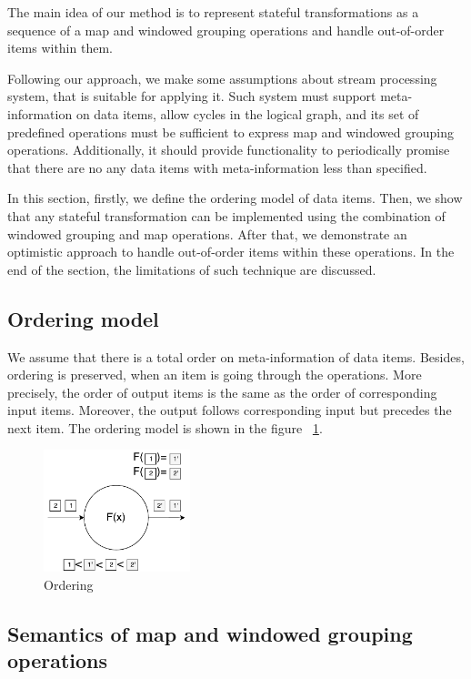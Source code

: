 
\label {fs-optimistic}

The main idea of our method is to represent stateful transformations as a sequence of a map and windowed grouping operations and handle out-of-order items within them. 

Following our approach, we make some assumptions about stream processing system, that is suitable for applying it. Such system must support meta-information on data items, allow cycles in the logical graph, and its set of predefined operations must be sufficient to express map and windowed grouping operations. Additionally, it should provide functionality to periodically promise that there are no any data items with meta-information less than specified.

In this section, firstly, we define the ordering model of data items. Then, we show that any stateful transformation can be implemented using the combination of windowed grouping and map operations. After that, we demonstrate an optimistic approach to handle out-of-order items within these operations. In the end of the section, the limitations of such technique are discussed.

\subsection{Ordering model}
We assume that there is a total order on meta-information of data items. Besides, ordering is preserved, when an item is going through the operations. More precisely, the order of output items is the same as the order of corresponding input items. Moreover, the output follows corresponding input but precedes the next item. The ordering model is shown in the figure ~\ref{ordering}.

\begin{figure}[htbp]
  \centering
  \includegraphics[width=0.38\textwidth]{pics/ordering}
  \caption{Ordering}
  \label {ordering}
\end{figure}

\subsection{Semantics of map and windowed grouping operations}

